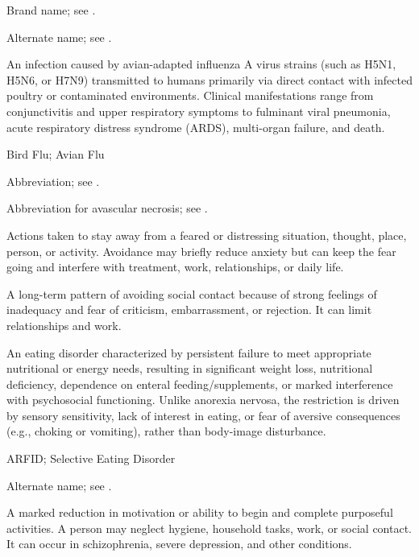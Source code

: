  Brand name; see .

 Alternate name; see .

 An infection caused by avian-adapted influenza A virus strains (such as H5N1, H5N6, or H7N9) transmitted to humans primarily via direct contact with infected poultry or contaminated environments. Clinical manifestations range from conjunctivitis and upper respiratory symptoms to fulminant viral pneumonia, acute respiratory distress syndrome (ARDS), multi-organ failure, and death.

\synonyms
Bird Flu; Avian Flu

 Abbreviation; see .

 Abbreviation for avascular necrosis; see .

 Actions taken to stay away from a feared or distressing situation, thought, place, person, or activity. Avoidance may briefly reduce anxiety but can keep the fear going and interfere with treatment, work, relationships, or daily life.

 A long-term pattern of avoiding social
contact because of strong feelings of inadequacy and fear of criticism,
embarrassment, or rejection. It can limit relationships and work.

 An eating disorder characterized by persistent failure to meet appropriate nutritional or energy needs, resulting in significant weight loss, nutritional deficiency, dependence on enteral feeding/supplements, or marked interference with psychosocial functioning. Unlike anorexia nervosa, the restriction is driven by sensory sensitivity, lack of interest in eating, or fear of aversive consequences (e.g., choking or vomiting), rather than body-image disturbance.

\synonyms
ARFID; Selective Eating Disorder

 Alternate name; see .

 A marked reduction in motivation or ability to begin and complete purposeful activities. A person may neglect hygiene, household tasks, work, or social contact. It can occur in schizophrenia, severe depression, and other conditions.

